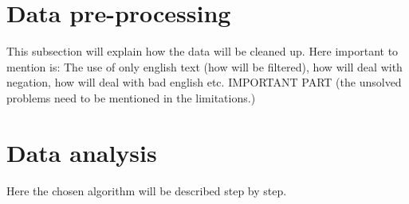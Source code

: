 \section{Data pre-processing}
This subsection will explain how the data will be cleaned up. Here important to mention is: The use of only english text (how will be filtered), how will deal with negation, how will deal with bad english etc. IMPORTANT PART (the unsolved problems need to be mentioned in the limitations.)

\section{Data analysis}
Here the chosen algorithm will be described step by step. 
